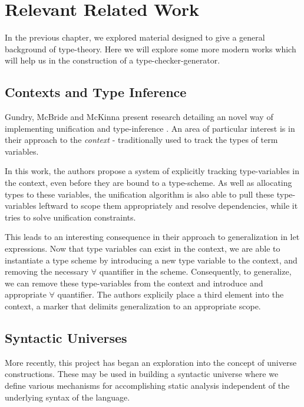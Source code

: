 \chapter{Relevant Related Work}

In the previous chapter, we explored material designed to give a
general background of type-theory. Here we will explore some more
modern works which will help us in the construction of a
type-checker-generator.

\section{Contexts and Type Inference}

Gundry, McBride and McKinna present research detailing an
novel way of implementing unification and
type-inference \cite{TypeInferenceInContext}. An area of
particular interest is in their approach to the
\emph{context} - traditionally used to track the types of
term variables.

In this work, the authors propose a system of explicitly
tracking type-variables in the context, even before they are
bound to a type-scheme. As well as allocating types
to these variables, the unification algorithm is also
able to pull these type-variables leftward to scope them
appropriately and resolve dependencies, while it tries to
solve unification constraints.

This leads to an interesting consequence in their approach to
generalization in let expressions. Now that type variables
can exist in the context, we are able to instantiate a type
scheme by introducing a new type variable to the context,
and removing the necessary $\forall$ quantifier in the
scheme. Consequently, to generalize, we can remove these
type-variables from the context and introduce and
appropriate $\forall$ quantifier. The authors explicily
place a third element into the context, a marker that delimits
generalization to an appropriate scope.

\section{Syntactic Universes}

More recently, this project has began an exploration into the concept of
universe constructions. These may be used in building a syntactic universe
where we define various mechanisms for accomplishing
static analysis independent of the underlying syntax of the
language.

